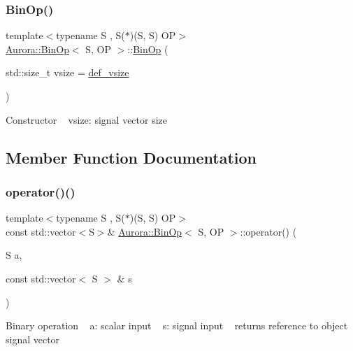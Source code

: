 \subsubsection{\texorpdfstring{Bin\+Op()}{BinOp()}}
{\footnotesize\ttfamily template$<$typename S , S($\ast$)(\+S, S) OP$>$ \\
\hyperlink{class_aurora_1_1_bin_op}{Aurora\+::\+Bin\+Op}$<$ S, OP $>$\+::\hyperlink{class_aurora_1_1_bin_op}{Bin\+Op} (\begin{DoxyParamCaption}\item[{std\+::size\+\_\+t}]{vsize = {\ttfamily \hyperlink{namespace_aurora_afaaddf667a06e7ce23c667a8b7295263}{def\+\_\+vsize}} }\end{DoxyParamCaption})\hspace{0.3cm}{\ttfamily [inline]}}

Constructor ~\newline
vsize\+: signal vector size 

\subsection{Member Function Documentation}
\mbox{\label{class_aurora_1_1_bin_op_aa1e2d8bf1a400b2298f736395cd58bca}} 
\subsubsection{\texorpdfstring{operator()()}{operator()()}\hspace{0.1cm}{\footnotesize\ttfamily [1/3]}}
{\footnotesize\ttfamily template$<$typename S , S($\ast$)(\+S, S) OP$>$ \\
const std\+::vector$<$S$>$\& \hyperlink{class_aurora_1_1_bin_op}{Aurora\+::\+Bin\+Op}$<$ S, OP $>$\+::operator() (\begin{DoxyParamCaption}\item[{S}]{a,  }\item[{const std\+::vector$<$ S $>$ \&}]{s }\end{DoxyParamCaption})\hspace{0.3cm}{\ttfamily [inline]}}

Binary operation ~\newline
a\+: scalar input ~\newline
s\+: signal input ~\newline
returns reference to object signal vector \mbox{\label{class_aurora_1_1_bin_op_a3e182103fef21158d0a697e1dd687b47}} 
